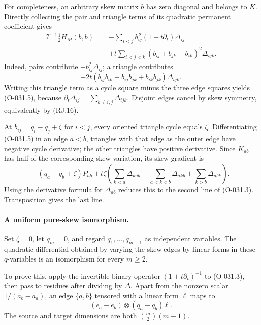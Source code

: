 For completeness, an arbitrary skew matrix \(b\) has
zero diagonal and belongs to \(K\). Directly collecting
the pair and triangle terms of its quadratic permanent
coefficient gives
\[
 \begin{split}
 \mathcal T^{-1}\frac12H_M(b,b)
 ={}&-\sum_{i<j}b_{ij}^{\,2}
                     (1+t\partial_t)\Delta_{ij}\\
    &+t\sum_{i<j<k}
               (b_{ij}+b_{jk}-b_{ik})^2\Delta_{ijk}.
 \end{split}                                                   \tag{O-031.5}
\]
Indeed, pairs contribute
\(-b_{ij}^2\Delta_{ij}\); a triangle contributes
\[
 -2t(b_{ij}b_{ik}-b_{ij}b_{jk}+b_{ik}b_{jk})\Delta_{ijk}.
\]
Writing this triangle term as a cycle square minus the
three edge squares yields (O-031.5), because
\(\partial_t\Delta_{ij}=\sum_{k\ne i,j}\Delta_{ijk}\).
Disjoint edges cancel by skew symmetry, equivalently
by (RJ.16).

At \(b_{ij}=q_i-q_j+\zeta\) for \(i<j\), every oriented
triangle cycle equals \(\zeta\). Differentiating
(O-031.5) in an edge \(a<b\), triangles with that edge
as the outer edge have negative cycle derivative;
the other triangles have positive derivative.
Since \(K_{ab}\) has half of the corresponding skew
variation, its skew gradient is
\[
 -(q_a-q_b+\zeta)P_{ab}
 +t\zeta\left(\sum_{k<a}\Delta_{kab}
       -\sum_{a<k<b}\Delta_{akb}
       +\sum_{k>b}\Delta_{abk}\right).
\]
Using the derivative formula for \(\Delta_{ab}\)
reduces this to the second line of (O-031.3).
Transposition gives the last line.

\paragraph{A uniform pure-skew isomorphism.}
Set \(\zeta=0\), let \(q_m=0\), and regard
\(q_1,\ldots,q_{m-1}\) as independent variables.
The quadratic differential obtained by varying the
skew edges by linear forms in these \(q\)-variables is
an isomorphism for every \(m\geq2\).

To prove this, apply the invertible binary operator
\((1+t\partial_t)^{-1}\) to (O-031.3), then pass to
residues after dividing by \(\Delta\).
Apart from the nonzero scalar \(1/(a_b-a_a)\), an
edge \(\{a,b\}\) tensored with a linear form \(\ell\)
maps to
\[
                    (e_a-e_b)\otimes(q_a-q_b)\ell .
                                                               \tag{O-031.6}
\]
The source and target dimensions are both
\(\binom m2(m-1)\).

